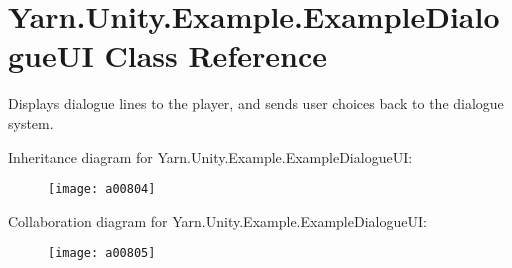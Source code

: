 \hypertarget{a00101}{\section{Yarn.\-Unity.\-Example.\-Example\-Dialogue\-U\-I Class Reference}
\label{a00101}
}


Displays dialogue lines to the player, and sends user choices back to the dialogue system.  




Inheritance diagram for Yarn.\-Unity.\-Example.\-Example\-Dialogue\-U\-I\-:
\nopagebreak
\begin{figure}[H]
\begin{center}
\leavevmode
\texttt{[image: a00804]}
\end{center}
\end{figure}


Collaboration diagram for Yarn.\-Unity.\-Example.\-Example\-Dialogue\-U\-I\-:
\nopagebreak
\begin{figure}[H]
\begin{center}
\leavevmode
\texttt{[image: a00805]}
\end{center}
\end{figure}
